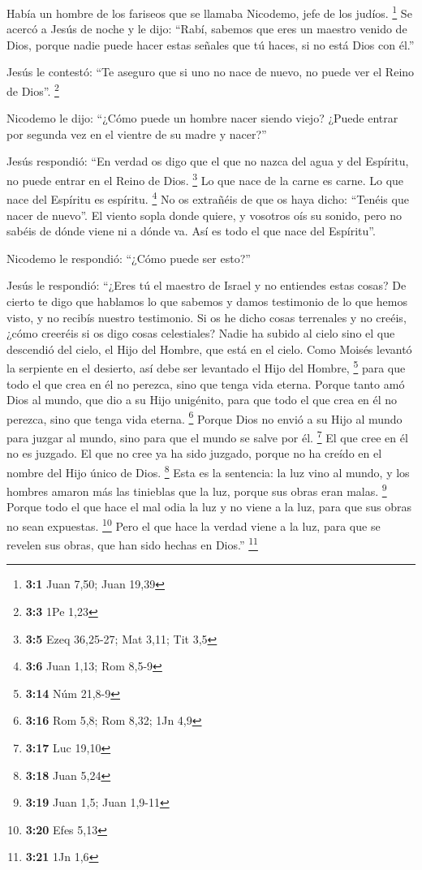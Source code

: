  Había un hombre de los fariseos que se llamaba Nicodemo,
jefe de los judíos. \footnote{\textbf{3:1} Juan 7,50; Juan 19,39}
 Se acercó a Jesús de noche y le dijo: ``Rabí, sabemos que
eres un maestro venido de Dios, porque nadie puede hacer estas señales
que tú haces, si no está Dios con él.''

 Jesús le contestó: ``Te aseguro que si uno no nace de
nuevo, no puede ver el Reino de Dios''. \footnote{\textbf{3:3} 1Pe 1,23}

 Nicodemo le dijo: ``¿Cómo puede un hombre nacer siendo
viejo? ¿Puede entrar por segunda vez en el vientre de su madre y
nacer?''

 Jesús respondió: ``En verdad os digo que el que no nazca
del agua y del Espíritu, no puede entrar en el Reino de Dios.
\footnote{\textbf{3:5} Ezeq 36,25-27; Mat 3,11; Tit 3,5} 
Lo que nace de la carne es carne. Lo que nace del Espíritu es espíritu.
\footnote{\textbf{3:6} Juan 1,13; Rom 8,5-9}  No os
extrañéis de que os haya dicho: ``Tenéis que nacer de nuevo''.
 El viento sopla donde quiere, y vosotros oís su sonido,
pero no sabéis de dónde viene ni a dónde va. Así es todo el que nace del
Espíritu''.

 Nicodemo le respondió: ``¿Cómo puede ser esto?''

 Jesús le respondió: ``¿Eres tú el maestro de Israel y no
entiendes estas cosas?  De cierto te digo que hablamos lo
que sabemos y damos testimonio de lo que hemos visto, y no recibís
nuestro testimonio.  Si os he dicho cosas terrenales y no
creéis, ¿cómo creeréis si os digo cosas celestiales? 
Nadie ha subido al cielo sino el que descendió del cielo, el Hijo del
Hombre, que está en el cielo.  Como Moisés levantó la
serpiente en el desierto, así debe ser levantado el Hijo del Hombre,
\footnote{\textbf{3:14} Núm 21,8-9}  para que todo el que
crea en él no perezca, sino que tenga vida eterna. 
Porque tanto amó Dios al mundo, que dio a su Hijo unigénito, para que
todo el que crea en él no perezca, sino que tenga vida eterna.
\footnote{\textbf{3:16} Rom 5,8; Rom 8,32; 1Jn 4,9} 
Porque Dios no envió a su Hijo al mundo para juzgar al mundo, sino para
que el mundo se salve por él. \footnote{\textbf{3:17} Luc 19,10}
 El que cree en él no es juzgado. El que no cree ya ha
sido juzgado, porque no ha creído en el nombre del Hijo único de Dios.
\footnote{\textbf{3:18} Juan 5,24}  Esta es la sentencia:
la luz vino al mundo, y los hombres amaron más las tinieblas que la luz,
porque sus obras eran malas. \footnote{\textbf{3:19} Juan 1,5; Juan
  1,9-11}  Porque todo el que hace el mal odia la luz y
no viene a la luz, para que sus obras no sean expuestas. \footnote{\textbf{3:20}
  Efes 5,13}  Pero el que hace la verdad viene a la luz,
para que se revelen sus obras, que han sido hechas en Dios.''
\footnote{\textbf{3:21} 1Jn 1,6}

